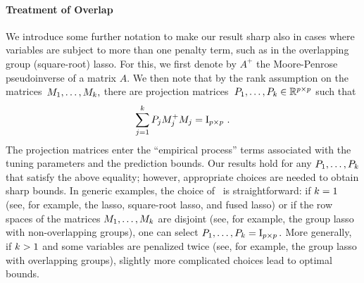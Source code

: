 \documentclass[bj]{imsart}
\newcommand{\1}{{\rm 1}\mskip -4,5mu{\rm l} }
\def\R{\mathbb{R}}
\begin{document}
\paragraph{Treatment of Overlap} We introduce some further notation to make our result sharp also in cases where variables are subject to more than one penalty term, such as in the overlapping group (square-root) lasso.
For this, we first denote by $A^+$ the Moore-Penrose pseudoinverse of a matrix $A$. We then note that by the rank assumption on the matrices~$M_1,\dots,M_{k},$ there are projection matrices~$\projectionmatrixs\in\R^{p\times p}$ such that 
\begin{equation}
\label{eq:partition}
  \sum_{j=1}^{k}\textcolor{black}{P_j}M_j^{+}M_j=\operatorname{I}_{p\times p}\,.
\end{equation}
The projection matrices enter the ``empirical process'' terms associated with the tuning parameters and  the prediction bounds. Our results hold for any $\textcolor{black}{P_1,\dots,P_{k}}$ that satisfy the above equality; however, appropriate choices are needed to obtain sharp bounds.  In generic examples, the choice of \projectionmatrixs\ is straightforward: if $k=1$ (see, for example, the lasso, square-root lasso, and fused lasso) or if the row spaces of the matrices $M_1,\dots,M_{k}$ are disjoint (see, for example, the group lasso with non-overlapping groups), one can select $\textcolor{black}{P_1,\dots,P_{k}}=\operatorname{I}_{p\times p}.$ More generally, if $k>1$ and some variables are penalized twice (see, for example, the group lasso with overlapping groups), slightly more complicated choices lead to  optimal bounds.
\end{document}
